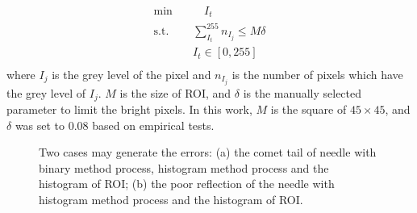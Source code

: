 \documentclass[journal,article,submit,moreauthors,pdftex]{Definitions/mdpi}
\begin{document}
\begin{equation}
\begin{aligned}
\textrm{min} \quad & \quad I_t \\
\textrm{s.t.} \quad & \sum_{I_t}^{255} n_{I_j} \leq M\delta \\
 &I_t\in[0,255] \\
\end{aligned}
\end{equation}
where ${I_j}$ is the grey level of the pixel and ${n_{I_j}}$ is the number of pixels which have the grey level of ${I_j}$.
${M}$ is the size of ROI, and ${\delta}$ is the manually selected parameter to limit the bright pixels.
In this work, ${M}$ is the square of ${45\times45}$, and ${\delta}$ was set to 0.08 based on empirical tests.

\begin{figure}[H]
\centering
{}
\captionsetup{width=16 cm,justification=centering}
\caption{Two cases may generate the errors: (a) the comet tail of needle with binary method process, histogram method process and the histogram of ROI; (b) the poor reflection of the needle with histogram method process and the histogram of ROI.}
\label{fig:3}
\end{figure}
\end{document}
